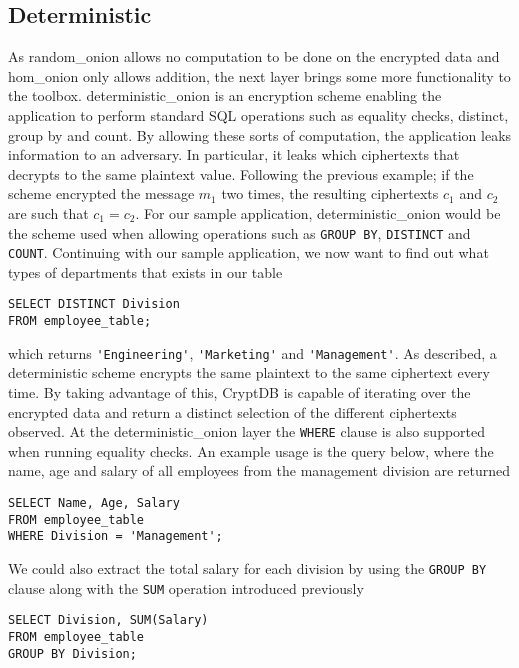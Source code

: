 

\subsection{Deterministic}
\label{sec:det}

As \Gls{random_onion} allows no computation to be done on the encrypted data and \gls{hom_onion} only allows addition, the next layer brings some more functionality to the toolbox. \Gls{deterministic_onion} is an encryption scheme enabling the application to perform standard SQL operations such as equality checks, distinct, group by and count. By allowing these sorts of computation, the application leaks information to an adversary. In particular, it leaks which ciphertexts that decrypts to the same plaintext value. Following the previous example; if the scheme encrypted the message $m_1$ two times, the resulting ciphertexts $c_1$ and $c_2$ are such that $c_1 = c_2$. For our sample application, \Gls{deterministic_onion} would be the scheme used when allowing operations such as \verb!GROUP BY!, \verb!DISTINCT! and \verb!COUNT!. Continuing with our sample application, we now want to find out what types of departments that exists in our table

\begin{verbatim}
SELECT DISTINCT Division
FROM employee_table;
\end{verbatim}
\noindent
which returns \verb!'Engineering'!, \verb!'Marketing'! and \verb!'Management'!. As described, a deterministic scheme encrypts the same plaintext to the same ciphertext every time. By taking advantage of this, CryptDB is capable of iterating over the encrypted data and return a distinct selection of the different ciphertexts observed. At the \gls{deterministic_onion} layer the \verb!WHERE! clause is also supported when running equality checks. An example usage is the query below, where the name, age and salary of all employees from the management division are returned

\begin{verbatim}
SELECT Name, Age, Salary
FROM employee_table
WHERE Division = 'Management';
\end{verbatim}

\noindent
We could also extract the total salary for each division by using the \verb!GROUP BY! clause along with the \verb!SUM! operation introduced previously

\begin{verbatim}
SELECT Division, SUM(Salary)
FROM employee_table
GROUP BY Division;
\end{verbatim}

